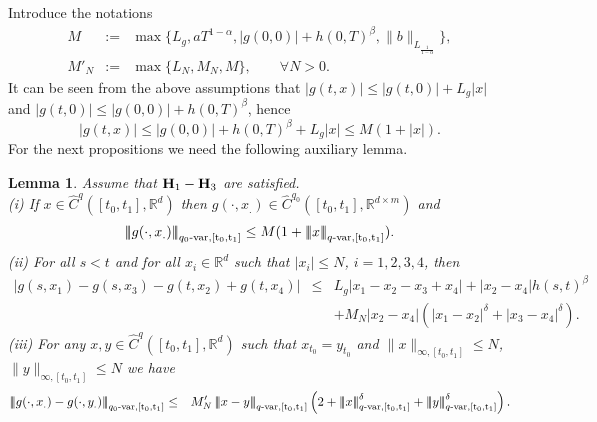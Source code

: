 \documentclass[10pt]{article}
\numberwithin{equation}{section} %
\newcommand{\R}{\ensuremath{\mathbb{R}}}
\newcommand{\ltn}{\ensuremath{\left| \! \left| \! \left|}}
\newcommand{\rtn}{\ensuremath{\right| \! \right| \! \right|}}
\newtheorem{lemma}[theorem]{Lemma}
\begin{document}
Introduce the notations
\begin{eqnarray}\label{M}
M&:=&\max\{L_g,aT^{1-\alpha},|g(0,0)|+h(0,T)^\beta,\|b\|_{L_{\frac{1}{1-\alpha}}}\},\\ 
M'_N&:=&\max\{L_N,M_N,M\},\qquad \forall N>0.
\end{eqnarray}
It can be seen from the above assumptions that $|g(t,x)|\leq |g(t,0)|+ L_g|x|$ and $|g(t,0)|\leq |g(0,0)|+ h(0,T)^{\beta} $, hence 
\begin{equation}\label{g}
|g(t,x)|\leq |g(0,0)|+ h(0,T)^{\beta}+ L_g|x| \leq M(1+|x|).
\end{equation}
For the next propositions we need the following auxiliary lemma.
\begin{lemma}\label{lemma2}
	Assume that ${\textbf H}_1-{\textbf H}_3$ are satisfied.\\
	(i) If $x \in \widehat{C}^{q}([t_0,t_1],\R^d)$ then $g(\cdot,x_.) \in \widehat{C}^{q_0}([t_0,t_1],\R^{d\times m})$ and 
	\begin{eqnarray}\label{gx}
	\ltn g(\cdot,x_.)\rtn_{q_0\text{-}\rm{var},[t_0,t_1]}\leq M(1+\ltn x\rtn_{q\text{-}\rm{var},[t_0,t_1]}).
	\end{eqnarray}
	(ii) For all $s< t$ and for all $x_i\in \R^d$  such that $|x_i|\leq N$, $i=1,2,3,4$, then
	\begin{eqnarray*}
	|g(s,x_1)-g(s,x_3)-g(t,x_2)+g(t,x_4)|&\leq& L_g|x_1-x_2-x_3+x_4|+ |x_2-x_4|h(s,t)^\beta\\
	&&+ M_N|x_2-x_4|(|x_1-x_2|^{\delta}+|x_3-x_4|^{\delta}).
	\end{eqnarray*}
	(iii) For any $x,y \in \widehat{C}^{q}([t_0,t_1],\R^d)$ such that $x_{t_0} = y_{t_0}$ and $\|x\|_{\infty,[t_0,t_1]}\leq N$, $\|y\|_{\infty,[t_0,t_1]}\leq N$ we have
	\begin{eqnarray}\label{gxy}
	\ltn g(\cdot,x_.)-g(\cdot,y_.)\rtn_{q_0\text{-}\rm{var},[t_0,t_{1}]}&\leq &M'_N\ltn x-y\rtn_{q\text{-}\rm{var},[t_0,t_{1}]} \left(2+\ltn x\rtn^{\delta}_{q\text{-}\rm{var},[t_0,t_{1}]}+\ltn y\rtn^{\delta}_{q\text{-}\rm{var},[t_0,t_{1}]}\right).\notag\\
		\end{eqnarray}
\end{lemma}
\end{document}

